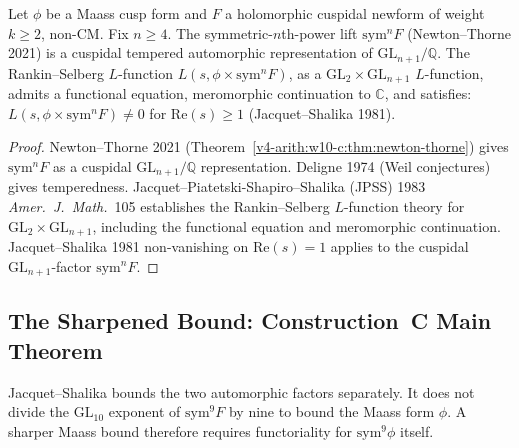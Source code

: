 \begin{proposition}
\label{v4-arith:w10-c:prop:sym-transfer}
Let \(\phi\) be a Maass cusp form and \(F\) a
holomorphic cuspidal newform of weight \(k\geq 2\), non-CM. Fix
\(n\geq 4\). The symmetric-\(n\)th-power lift \(\mathrm{sym}^{n}F\)
(Newton--Thorne 2021) is a cuspidal tempered automorphic representation
of \(\mathrm{GL}_{n+1}/\mathbb{Q}\). The Rankin--Selberg \(L\)-function
\(L(s,\phi\times\mathrm{sym}^{n}F)\), as a \(\mathrm{GL}_{2}\times\mathrm{GL}_{n+1}\)
\(L\)-function, admits a functional equation, meromorphic continuation
to \(\mathbb{C}\), and satisfies: \(L(s,\phi\times\mathrm{sym}^{n}F)\neq 0\)
for \(\mathrm{Re}(s)\geq 1\) (Jacquet--Shalika 1981).
\end{proposition}

\begin{proof}
Newton--Thorne 2021 (Theorem~\ref{v4-arith:w10-c:thm:newton-thorne}) gives
\(\mathrm{sym}^{n}F\) as a cuspidal \(\mathrm{GL}_{n+1}/\mathbb{Q}\)
representation. Deligne 1974 (Weil conjectures) gives temperedness.
Jacquet--Piatetski-Shapiro--Shalika (JPSS) 1983
\emph{Amer.~J.~Math.}~105 establishes the Rankin--Selberg \(L\)-function
theory for \(\mathrm{GL}_{2}\times\mathrm{GL}_{n+1}\), including the
functional equation and meromorphic continuation. Jacquet--Shalika
1981 non-vanishing on \(\mathrm{Re}(s)=1\) applies to the cuspidal
\(\mathrm{GL}_{n+1}\)-factor \(\mathrm{sym}^{n}F\).
\end{proof}

\subsection{The Sharpened Bound: Construction~C Main Theorem}
\label{v4-arith:w10-c:construction-C:main}

\begin{remark}
Jacquet--Shalika bounds the two automorphic factors separately. It does
not divide the \(\mathrm{GL}_{10}\) exponent of \(\mathrm{sym}^{9}F\) by
nine to bound the Maass form \(\phi\). A sharper Maass bound therefore
requires functoriality for \(\mathrm{sym}^{9}\phi\) itself.
\end{remark}

